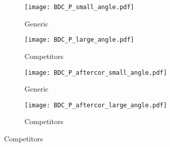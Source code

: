 \begin{figure}[!htb]
    \centering
    \begin{subfigure}[t]{0.45\textwidth}
        \centering
        \texttt{[image: BDC\_P\_small\_angle.pdf]} 
        \caption{Generic} \label{fig:mom_S_before}
    \end{subfigure}
    \hfill
    \begin{subfigure}[t]{0.45\textwidth}
        \centering
        \texttt{[image: BDC\_P\_large\_angle.pdf]} 
        \caption{Competitors} \label{fig:mom_L_before}
    \end{subfigure}
    
    \begin{subfigure}[t]{0.45\textwidth}
        \centering
        \texttt{[image: BDC\_P\_aftercor\_small\_angle.pdf]} 
        \caption{Generic} \label{fig:mom_S_after}
    \end{subfigure}
    \hfill
    \begin{subfigure}[t]{0.45\textwidth}
        \centering
        \texttt{[image: BDC\_P\_aftercor\_large\_angle.pdf]} 
        \caption{Competitors} \label{fig:mom_L_after}
    \end{subfigure}
\label{fig:mom_sc}
\end{figure}


\begin{comment}

\begin{figure}[!htb]
    \centering
    \begin{subfigure}[t]{0.49\textwidth}
        \centering
        \texttt{[image: BDC\_P\_frac\_small\_angle.pdf]} 
        \caption{Generic} \label{fig:mom_S_1D}
    \end{subfigure}
    \hfill
    \begin{subfigure}[t]{0.49\textwidth}
        \centering
        \texttt{[image: BDC\_P\_frac\_large\_angle.pdf]} 
        \caption{Competitors} \label{fig:mom_L_1D}
    \end{subfigure}
    
\label{fig:mom_1D}
\end{figure}
\end{comment}





